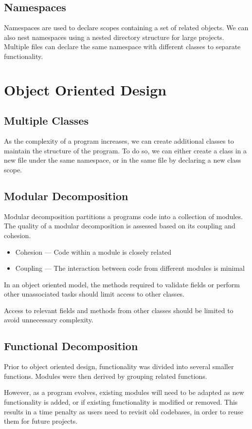 \documentclass{article}
\begin{document}
\subsection{Namespaces}
Namespaces are used to declare scopes containing a set of related objects. We can also nest namespaces
using a nested directory structure for large projects. Multiple files can declare the same namespace
with different classes to separate functionality.
\section{Object Oriented Design}
\subsection{Multiple Classes}
As the complexity of a program increases, we can create additional classes to maintain the structure of
the program. To do so, we can either create a class in a new file under the same namespace, or in the
same file by declaring a new class scope.
\subsection{Modular Decomposition}
Modular decomposition partitions a programs code into a collection of modules.
The quality of a modular decomposition is assessed based on its coupling and cohesion.
\begin{itemize}
    \item Cohesion --- Code within a module is closely related
    \item Coupling --- The interaction between code from different modules is minimal
\end{itemize}
In an object oriented model, the methods required to validate fields or perform other
unassociated tasks should limit access to other classes.

Access to relevant fields and methods from other classes should be
limited to avoid unnecessary complexity.
\subsection{Functional Decomposition}
Prior to object oriented design, functionality was divided into several smaller functions.
Modules were then derived by grouping related functions.

However, as a program evolves, existing modules will need to be adapted
as new functionality is added, or if existing functionality is modified or removed.
This results in a time penalty as users need to revisit old codebases,
in order to reuse them for future projects.
\end{document}
